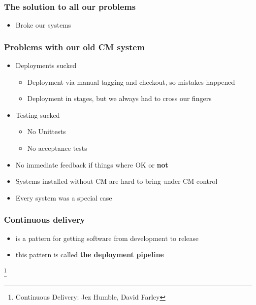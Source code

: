 \documentclass{beamer}
\begin{document}
\begin{frame}
  \frametitle{The solution to all our problems}
  \pause
  \begin{itemize}
  \item Broke our systems
  \end{itemize}
\end{frame}

\begin{frame}
\end{frame}

\begin{frame}
  \frametitle{Problems with our old CM system}

  \begin{itemize}
  \item <1-> Deployments sucked
    \begin{itemize}
    \item <2-> Deployment via manual tagging and checkout, so mistakes happened
    \item <2-> Deployment in stages, but we always had to cross our fingers
    \end{itemize}
  \item <3-> Testing sucked
    \pause
    \begin{itemize}
    \item <4-> No Unittests
    \item <4-> No acceptance tests
    \end{itemize}
  \item <5-> No immediate feedback if things where OK or \textbf{not}
  \item <6-> Systems installed without CM are hard to bring under CM control
  \item <7-> Every system was a special case
  \end{itemize}
\end{frame}

\begin{frame}
\end{frame}


\begin{frame}
  \frametitle{Continuous delivery}
  \begin{itemize}
  \item<1-> is a pattern for getting software from development to release
  \item<2-> this pattern is called \textbf{the deployment pipeline}
  \end{itemize}
  \footnote{Continuous Delivery: Jez Humble, David Farley}
\end{frame}
\end{document}
